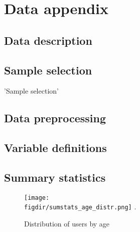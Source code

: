 
\section{Data appendix}
\label{sec:data_appendix}

\subsection{Data description}
\label{sub:data_description}


\subsection{Sample selection}
\label{sub:sample_selection}

\begin{table}[h]
\caption{'Sample selection'}\label{tab:selection}

\end{table}


\subsection{Data preprocessing}
\label{sub:data_preprocessing}


\subsection{Variable definitions}
\label{sub:variable_definitions}


\subsection{Summary statistics}
\label{sub:summary_statistics}

\begin{figure}[h]\centering
\caption{Distribution of users by age
\label{fig:age_distr}}
    \texttt{[image: \\figdir/sumstats\_age\_distr.png]}
    .
\end{figure}